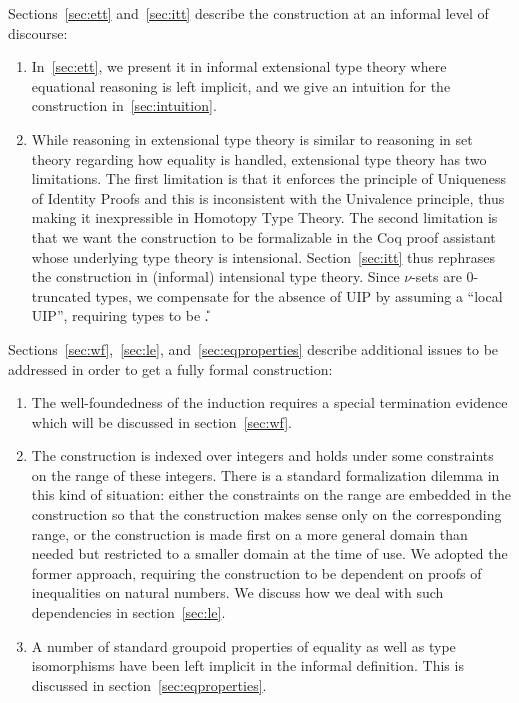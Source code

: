 \documentclass{msc}
\begin{document}
Sections~\ref{sec:ett} and~\ref{sec:itt} describe the construction at an informal level of discourse:
\begin{enumerate}
  \item In~\ref{sec:ett}, we present it in informal extensional type theory where equational reasoning is left implicit, and we give an intuition for the construction in~\ref{sec:intuition}.
  \item While reasoning in extensional type theory is similar to reasoning in set theory regarding how equality is handled, extensional type theory has two limitations. The first limitation is that it enforces the principle of Uniqueness of Identity Proofs and this is inconsistent with the Univalence principle, thus making it inexpressible in Homotopy Type Theory. The second limitation is that we want the construction to be formalizable in the Coq proof assistant whose underlying type theory is intensional. Section~\ref{sec:itt} thus rephrases the construction in (informal) intensional type theory. Since $\nu$-sets are $0$-truncated types, we compensate for the absence of UIP by assuming a ``local UIP'', requiring types to be \U.
\end{enumerate}

Sections~\ref{sec:wf},~\ref{sec:le}, and~\ref{sec:eqproperties} describe additional issues to be addressed in order to get a fully formal construction:
\begin{enumerate}
  \item The well-foundedness of the induction requires a special termination evidence which will be discussed in section~\ref{sec:wf}.
  \item The construction is indexed over integers and holds under some constraints on the range of these integers. There is a standard formalization dilemma in this kind of situation: either the constraints on the range are embedded in the construction so that the construction makes sense only on the corresponding range, or the construction is made first on a more general domain than needed but restricted to a smaller domain at the time of use. We adopted the former approach, requiring the construction to be dependent on proofs of inequalities on natural numbers. We discuss how we deal with such dependencies in section~\ref{sec:le}.
  \item A number of standard groupoid properties of equality as well as type isomorphisms have been left implicit in the informal definition. This is discussed in section~\ref{sec:eqproperties}.
\end{enumerate}
\end{document}
